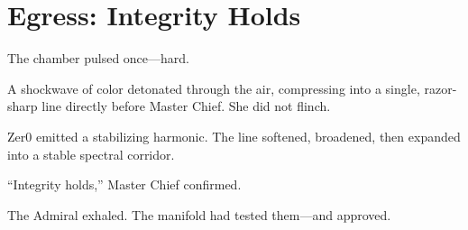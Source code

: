 \section*{Egress: Integrity Holds}
The chamber pulsed once—hard.

A shockwave of color detonated through the air, compressing into a single,
razor-sharp line directly before Master Chief. She did not flinch.

Zer0 emitted a stabilizing harmonic. The line softened, broadened, then 
expanded into a stable spectral corridor.

“Integrity holds,” Master Chief confirmed.

The Admiral exhaled.
The manifold had tested them—and approved.
